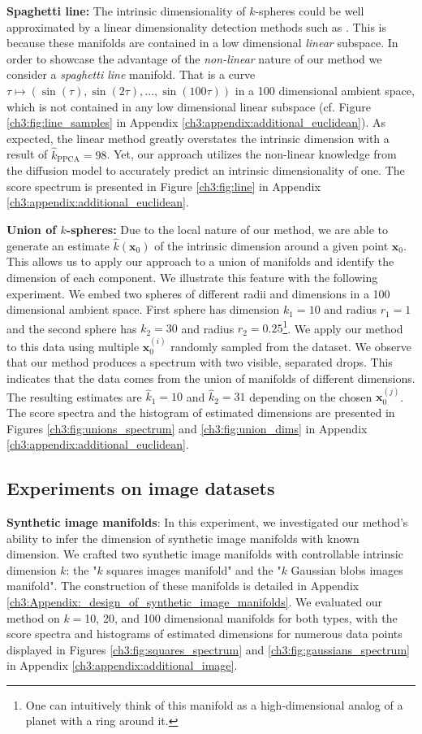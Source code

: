 \textbf{Spaghetti line:} The intrinsic dimensionality of $k$-spheres could be well approximated by a linear dimensionality detection methods such as \cite{auto_ppca}. This is because these manifolds are contained in a low dimensional \textit{linear} subspace. In order to showcase the advantage of the \textit{non-linear} nature of our method we consider a \textit{spaghetti line} manifold. That is a curve $\tau \mapsto (\sin(\tau), \sin(2\tau), ..., \sin(100\tau))$ in a 100 dimensional ambient space, which is not contained in any low dimensional linear subspace (cf. Figure \ref{ch3:fig:line_samples} in Appendix \ref{ch3:appendix:additional_euclidean}). As expected, the linear method \cite{auto_ppca} greatly overstates the intrinsic dimension with a result of $\hat{k}_{\text{PPCA}}=98$. Yet, our approach utilizes the non-linear knowledge from the diffusion model to accurately predict an intrinsic dimensionality of one.  The score spectrum is presented in Figure \ref{ch3:fig:line} in Appendix \ref{ch3:appendix:additional_euclidean}.


\textbf{Union of $k$-spheres:} Due to the local nature of our method, we are able to generate an estimate $\hat{k}(\textbf{x}_0)$ of the intrinsic dimension around a given point $\textbf{x}_0$. This allows us to apply our approach to a union of manifolds and identify the dimension of each component. We illustrate this feature with the following experiment. We embed two spheres of different radii and dimensions in a 100 dimensional ambient space. First sphere has dimension $k_1 = 10$ and radius $r_1 = 1$ and the second sphere has $k_2=30$ and radius $r_2 = 0.25$\footnote{One can intuitively think of this manifold as a high-dimensional analog of a planet with a ring around it.}. We apply our method to this data using multiple $\textbf{x}_0^{(i)}$ randomly sampled from the dataset. We observe that our method produces a spectrum with two visible, separated drops. This indicates that the data comes from the union of manifolds of different dimensions. The resulting estimates are $\hat{k}_1 = 10$ and $\hat{k}_2=31$ depending on the chosen  $\textbf{x}_0^{(j)}$. The score spectra and the histogram of estimated dimensions are presented in Figures \ref{ch3:fig:unions_spectrum} and \ref{ch3:fig:union_dims} in Appendix \ref{ch3:appendix:additional_euclidean}.

\subsection{Experiments on image datasets}
\textbf{Synthetic image manifolds}: In this experiment, we investigated our method's ability to infer the dimension of synthetic image manifolds with known dimension. We crafted two synthetic image manifolds with controllable intrinsic dimension $k$: the "$k$ squares images manifold" and the "$k$ Gaussian blobs images manifold". The construction of these manifolds is detailed in Appendix \ref{ch3:Appendix:_design_of_synthetic_image_manifolds}. We evaluated our method on $k=$10, 20, and 100 dimensional manifolds for both types, with the score spectra and histograms of estimated dimensions for numerous data points displayed in Figures \ref{ch3:fig:squares_spectrum} and \ref{ch3:fig:gaussians_spectrum} in Appendix \ref{ch3:appendix:additional_image}.


